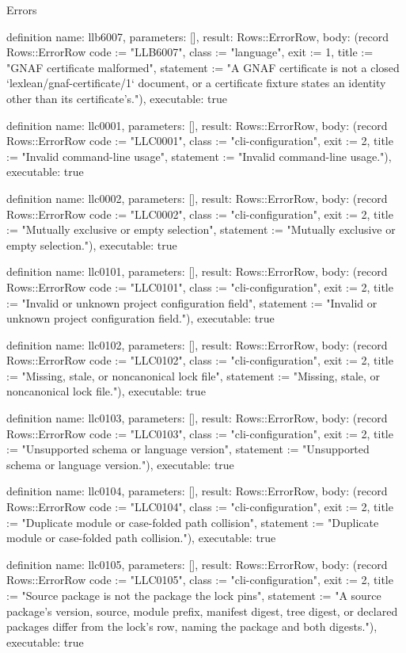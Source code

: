 \begin{lexlean}{Errors}
\begin{semanticmodule}
definition{
  name: llb6007,
  parameters: [],
  result: Rows::ErrorRow,
  body: (record Rows::ErrorRow {code := "LLB6007", class := "language", exit := 1, title := "GNAF certificate malformed", statement := "A GNAF certificate is not a closed `lexlean/gnaf-certificate/1` document, or a certificate fixture states an identity other than its certificate's."}),
  executable: true
}

definition{
  name: llc0001,
  parameters: [],
  result: Rows::ErrorRow,
  body: (record Rows::ErrorRow {code := "LLC0001", class := "cli-configuration", exit := 2, title := "Invalid command-line usage", statement := "Invalid command-line usage."}),
  executable: true
}

definition{
  name: llc0002,
  parameters: [],
  result: Rows::ErrorRow,
  body: (record Rows::ErrorRow {code := "LLC0002", class := "cli-configuration", exit := 2, title := "Mutually exclusive or empty selection", statement := "Mutually exclusive or empty selection."}),
  executable: true
}

definition{
  name: llc0101,
  parameters: [],
  result: Rows::ErrorRow,
  body: (record Rows::ErrorRow {code := "LLC0101", class := "cli-configuration", exit := 2, title := "Invalid or unknown project configuration field", statement := "Invalid or unknown project configuration field."}),
  executable: true
}

definition{
  name: llc0102,
  parameters: [],
  result: Rows::ErrorRow,
  body: (record Rows::ErrorRow {code := "LLC0102", class := "cli-configuration", exit := 2, title := "Missing, stale, or noncanonical lock file", statement := "Missing, stale, or noncanonical lock file."}),
  executable: true
}

definition{
  name: llc0103,
  parameters: [],
  result: Rows::ErrorRow,
  body: (record Rows::ErrorRow {code := "LLC0103", class := "cli-configuration", exit := 2, title := "Unsupported schema or language version", statement := "Unsupported schema or language version."}),
  executable: true
}

definition{
  name: llc0104,
  parameters: [],
  result: Rows::ErrorRow,
  body: (record Rows::ErrorRow {code := "LLC0104", class := "cli-configuration", exit := 2, title := "Duplicate module or case-folded path collision", statement := "Duplicate module or case-folded path collision."}),
  executable: true
}

definition{
  name: llc0105,
  parameters: [],
  result: Rows::ErrorRow,
  body: (record Rows::ErrorRow {code := "LLC0105", class := "cli-configuration", exit := 2, title := "Source package is not the package the lock pins", statement := "A source package's version, source, module prefix, manifest digest, tree digest, or declared packages differ from the lock's row, naming the package and both digests."}),
  executable: true
}


\end{semanticmodule}
\end{lexlean}

